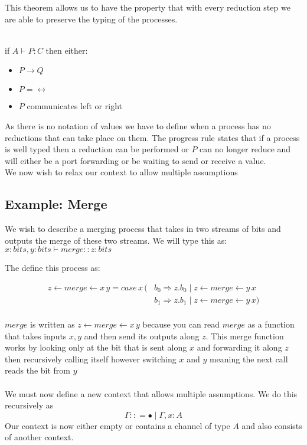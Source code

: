 \documentclass{article}
\begin{document}
This theorem allows us to have the property that with every reduction step we are able to preserve the typing of the processes.
\\\\
\begin{theorem}[Progress]
if \( A \vdash P:C \) then either:
\begin{itemize}
    \item \(P \rightarrow Q\)
    \item \( P = 	\leftrightarrow\)
    \item \( P\) communicates left or right
\end{itemize}
\end{theorem}
As there is no notation of values we have to define when a process has no reductions that can take place on them. The progress rule states that if a process is well typed then a reduction can be performed or \(P\) can no longer reduce and will either be a port forwarding or be waiting to send or receive a value. 
\\

We now wish to relax our context to allow multiple assumptions

\subsection{Example: Merge}

We wish to describe a merging process that takes in two streams of bits and outputs the merge of these two streams. We will type this as:
\(x : bits , y : bits \vdash merge :: z : bits\)

The define this process as:

\begin{equation*}
\begin{split}
z \leftarrow merge \leftarrow x \, y = case \, x \, ( &  b_0 \Rightarrow z.b_0 \mid z \leftarrow merge \leftarrow y \, x\\
 & b_1 \Rightarrow z.b_1 \mid z \leftarrow merge \leftarrow y \, x ) \\
\end{split}
\end{equation*}

\(merge\) is written as \(z \leftarrow merge \leftarrow x \, y \) because you can read \(merge\) as a function that takes inputs \(x, y\) and then send its outputs along \(z\). This merge function works by looking only at the bit that is sent along \(x\) and forwarding it along \(z\) then recursively calling itself however switching \(x\) and \(y\) meaning the next call reads the bit from \(y\)
\\
\\
We must now define a new context that allows multiple assumptions. We do this recursively as 
\[ \Gamma :: = 	\bullet \mid \Gamma , x:A \]
Our context is now either empty or contains a channel of type \(A\) and also consists of another context.
\end{document}
